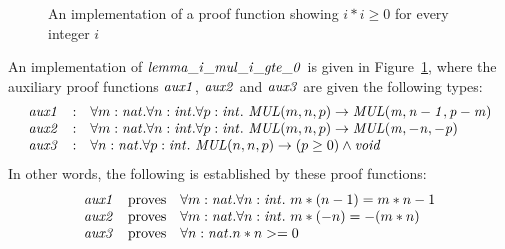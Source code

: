 \begin{figure}[thp]

\caption{An implementation of a proof function showing $i*i\geq 0$ for every integer $i$}
\label{figure:lemma_i_mul_i_gte_0_function}
\end{figure}
An implementation of ${\it lemma\_i\_mul\_i\_gte\_0}$ is given in
Figure~\ref{figure:lemma_i_mul_i_gte_0_function}, where the auxiliary
proof functions ${\it aux1}$, ${\it aux2}$ and ${\it aux3}$ are given
the following types:
\[\begin{array}{rcl}
{\it aux1} & : &
\forall{m:{\it nat}}.\forall{n:{\it int}}.\forall{p:{\it int}}.~{\it MUL}(m,n,p)\rightarrow{\it MUL(m,n-1,p-m)} \\
{\it aux2} & : &
\forall{m:{\it nat}}.\forall{n:{\it int}}.\forall{p:{\it int}}.~{\it MUL}(m,n,p)\rightarrow{\it MUL(m,-n,-p)} \\
{\it aux3} & : &
\forall{n:{\it nat}}.\forall{p:{\it int}}.~{\it MUL}(n,n,p)\rightarrow (p\geq0)\land{\it void} \\
\end{array}\]
In other words, the following is established by these proof functions:
\[\begin{array}{rcl}
{\it aux1} & {\rm proves} & \forall{m:{\it nat}}.\forall{n:{\it int}}.~m*(n-1)=m*n - 1 \\
{\it aux2} & {\rm proves} & \forall{m:{\it nat}}.\forall{n:{\it int}}.~m*(-n)=-(m*n) \\
{\it aux3} & {\rm proves} & \forall{n:{\it nat}}.n*n>=0 \\
\end{array}\]

